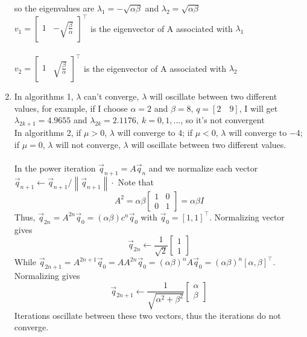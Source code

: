 \documentclass[english,onecolumn]{IEEEtran}
\begin{document}
\begin{enumerate}
    so the eigenvalues are $\lambda_{1}=-\sqrt{\alpha\beta}$ and $\lambda_{2}=\sqrt{\alpha\beta}$\\
    $v_1=\left[\begin{array}{cc}1 & -\sqrt{\frac{\beta}{\alpha}}\end{array}\right]^{\top}$ is the eigenvector of A associated with $\lambda_{1}$\\\\
    $v_2=\left[\begin{array}{cc}1 & \sqrt{\frac{\beta}{\alpha}}\end{array}\right]^{\top}$ is the eigenvector of A associated with $\lambda_{2}$
    
    \item
    In algorithms 1, $\lambda$ can't converge, $\lambda$ will oscillate between two different values, for example, if I choose $\alpha = 2 $ and $\beta = 8$, $q= [2\quad9]$, I will get $\lambda_{2k+1}=4.9655$ and $\lambda_{2k}=2.1176,\ k=0,1,...$, so it's not convergent\\
    In algorithms 2, if $\mu>0$, $\lambda$ will converge to $4$; if $\mu<0$, $\lambda$ will converge to $-4$; if $\mu=0$, $\lambda$ will not converge, $\lambda$ will oscillate between two different values.\\
    \\
    In the power iteration $\vec{q}_{n+1}=A \vec{q}_{n}$ and we normalize each vector $\vec{q}_{n+1} \leftarrow \vec{q}_{n+1} /\left\|\vec{q}_{n+1}\right\| \cdot$ Note that
    $$
    A^{2}=\alpha\beta\left[\begin{array}{ll}
    	1 & 0 \\
    	0 & 1
    \end{array}\right]=\alpha\beta I
    $$
    Thus, $\vec{q}_{2 n}=A^{2 n} \vec{q}_{0}=(\alpha\beta)c^{ n} \vec{q}_{0}$ with $\vec{q}_{0}=[1,1]^{\top}$. Normalizing vector gives
    $$
    \vec{q}_{2 n} \leftarrow \frac{1}{\sqrt{2}}\left[\begin{array}{l}
    	1 \\
    	1
    \end{array}\right]
    $$
    While $\vec{q}_{2 n+1}=A^{2 n+1} \vec{q}_{0}=A A^{2 n} \vec{q}_{0}=(\alpha\beta)^{n} A \vec{q}_{0}=(\alpha\beta)^{n}[\alpha,\beta]^{\top}$. Normalizing gives
    $$
    \vec{q}_{2 n+1} \leftarrow \frac{1}{\sqrt{\alpha^{2}+\beta^{2}}}\left[\begin{array}{c}
    	\alpha \\
    	\beta
    \end{array}\right]
    $$
    Iterations oscillate between these two vectors, thus the iterations do not converge.
    
    
    
\end{enumerate}
\end{document}
